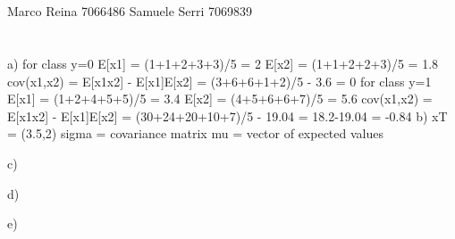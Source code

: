 \documentclass[12pt]{article}
\begin{document}
\section*{}
Marco Reina 7066486 \newline
Samuele Serri 7069839 \newline
\section*{}

a)
for class y=0
E[x1] = (1+1+2+3+3)/5 = 2
E[x2] = (1+1+2+2+3)/5 = 1.8
cov(x1,x2) = E[x1x2] - E[x1]E[x2] = (3+6+6+1+2)/5 - 3.6 = 0
for class y=1
E[x1] = (1+2+4+5+5)/5 = 3.4
E[x2] = (4+5+6+6+7)/5 = 5.6
cov(x1,x2) = E[x1x2] - E[x1]E[x2] = (30+24+20+10+7)/5 - 19.04 = 18.2-19.04 = -0.84
b)
xT = (3.5,2)
sigma = covariance matrix
mu = vector of expected values

c)


d)


e)
\end{document}
